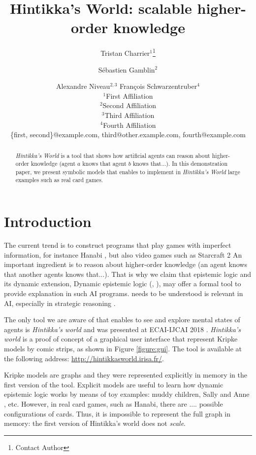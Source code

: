 \documentclass{article}
\title{Hintikka's World: scalable higher-order knowledge}
\author{
Tristan Charrier$^1$\footnote{Contact Author}\and
Sébastien Gamblin$^2$\and
Alexandre Niveau$^{2,3}$\And
François Schwarzentruber$^4$\\
\affiliations
$^1$First Affiliation\\
$^2$Second Affiliation\\
$^3$Third Affiliation\\
$^4$Fourth Affiliation\\
\emails
\{first, second\}@example.com,
third@other.example.com,
fourth@example.com
}
\begin{document}
\newcommand{\mettel}{\textsf{MetTeL2}\xspace}

\maketitle

\begin{abstract}
	\emph{Hintikka's World} is a tool that shows how artificial agents can reason about higher-order knowledge (agent $a$ knows that agent $b$ knows that...).
	In this demonstration paper, we present symbolic models  that enables to implement in  \emph{Hintikka's World} large examples such as real card games. 
\end{abstract}



\section{Introduction}

The current trend is to construct programs that play games with imperfect information, for instance Hanabi \cite{DBLP:journals/corr/abs-1902-00506}, but also video games such as Starcraft 2 \cite{DBLP:conf/ijcai/HuLLPX18} An important ingredient is to reason about higher-order knowledge (an agent knows that another agents knows that...). That is why we claim that epistemic logic and its dynamic extension, Dynamic epistemic logic (\cite{baltag1998logic}, \cite{DitmarschvdHoekKooi}), may offer a formal tool to provide explanation in such AI programs. needs to be understood is relevant in AI, especially in strategic reasoning \cite{DBLP:journals/ijgt/Aumann99}.

The only tool we are aware of that enables to see and explore mental states of agents is \emph{Hintikka's world} and was presented at ECAI-IJCAI 2018 \cite{DBLP:conf/ijcai/Schwarzentruber18}. 
\emph{Hintikka's world} is a proof of concept of a graphical user interface that represent Kripke models by  comic strips, as shown in Figure \ref{figure:gui}. The tool is available at the following address:
\url{http://hintikkasworld.irisa.fr/}. 


Kripke models are graphs and they were represented explicitly in memory in the first version of the tool. Explicit models are useful to learn how dynamic epistemic logic works by means of toy examples: muddy children, Sally and Anne  \cite{wimmer1983beliefs}, etc.  However, in real card games, such as Hanabi, there are .... possible configurations of cards. Thus, it is impossible to represent the full graph in memory:  the first version of Hintikka's world does not \emph{scale}. 
\end{document}
